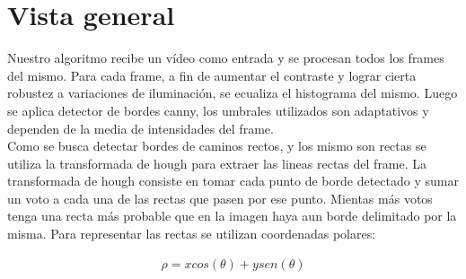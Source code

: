 \documentclass[a4paper,spanish]{article}
\begin{document}
\section{Vista general}

Nuestro algoritmo recibe un vídeo como entrada y se procesan todos los frames del mismo. Para cada frame, a fin de aumentar el contraste y lograr cierta robustez a variaciones de iluminación, se ecualiza el histograma del mismo.  Luego se aplica detector de bordes canny, los umbrales utilizados son adaptativos y dependen de la media de intensidades del frame. \\
	Como se busca detectar bordes de caminos rectos, y los mismo son rectas se utiliza la transformada de hough para extraer las lineas rectas del frame. La transformada de hough consiste en tomar cada punto de borde detectado y sumar un voto  a cada una de las rectas que pasen por ese punto. Mientas más votos  tenga una recta más probable  que en la imagen haya aun borde delimitado por la misma. Para representar las rectas se  utilizan coordenadas polares:
    
\begin{align*}
\rho = x cos(\theta) + y sen(\theta)
\end{align*}	
\end{document}
